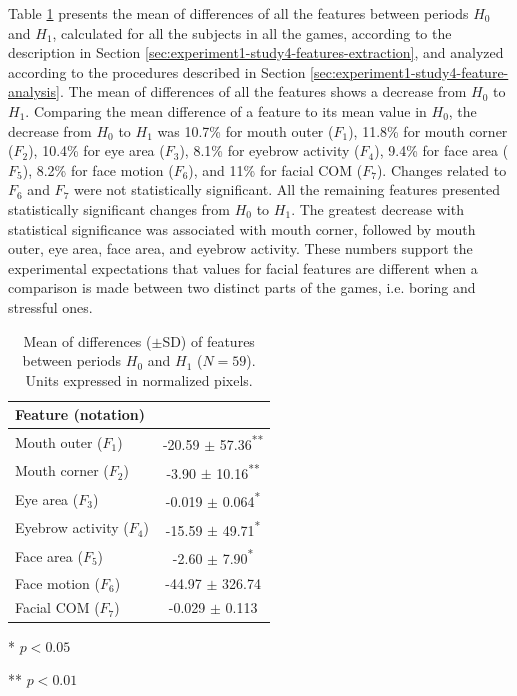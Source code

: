 Table \ref{table:changes} presents the mean of differences of all the features between periods $H_0$ and $H_1$, calculated for all the subjects in all the games, according to the description in Section \ref{sec:experiment1-study4-features-extraction}, and analyzed according to the procedures described in Section \ref{sec:experiment1-study4-feature-analysis}. The mean of differences of all the features shows a decrease from $H_0$ to $H_1$. Comparing the mean difference of a feature to its mean value in $H_0$, the decrease from $H_0$ to $H_1$ was 10.7\% for mouth outer ($F_1$), 11.8\% for mouth corner ($F_2$), 10.4\% for eye area ($F_3$), 8.1\% for eyebrow activity ($F_4$), 9.4\% for face area ($F_5$), 8.2\% for face motion ($F_6$), and 11\% for facial COM ($F_7$). Changes related to $F_6$ and $F_7$ were not statistically significant. All the remaining features presented statistically significant changes from $H_0$ to $H_1$. The greatest decrease with statistical significance was associated with mouth corner, followed by mouth outer, eye area, face area, and eyebrow activity. These numbers support the experimental expectations that values for facial features are different when a comparison is made between two distinct parts of the games, i.e. boring and stressful ones.

\begin{table}
    \caption{Mean of differences ($\pm$SD) of features between periods $H_0$ and $H_1$ ($N=59$). Units expressed in normalized pixels.}
    \label{table:changes}
    \centering
    \begin{threeparttable}
        \begin{tabular}{lc}
            \toprule%
                \textbf{Feature (notation)} &  \\
            \midrule%
                Mouth outer ($F_1$)      & -20.59 $\pm$ 57.36\textsuperscript{**} \\
                Mouth corner ($F_2$)     & -3.90 $\pm$ 10.16\textsuperscript{**} \\
                Eye area ($F_3$)         & -0.019 $\pm$ 0.064\textsuperscript{*} \\
                Eyebrow activity ($F_4$) & -15.59 $\pm$ 49.71\textsuperscript{*} \\
                Face area ($F_5$)        & -2.60 $\pm$ 7.90\textsuperscript{*} \\
                Face motion ($F_6$)      & -44.97 $\pm$ 326.74 \\
                Facial COM ($F_7$)       & -0.029 $\pm$ 0.113 \\
            \bottomrule%
        \end{tabular}
        \begin{tablenotes}
          \small
          \item[*]{$p < 0.05$}
          \item[**]{$p < 0.01$}
        \end{tablenotes}
    \end{threeparttable}
\end{table}


